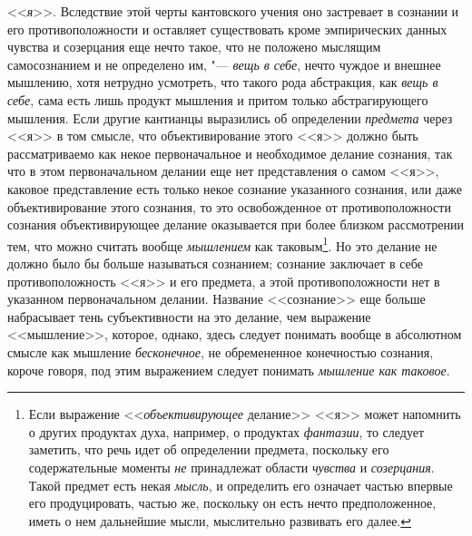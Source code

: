 <<{\em я}>>. Вследствие этой черты кантовского учения оно
застревает в сознании и его противоположности и оставляет существовать
кроме эмпирических данных чувства и созерцания еще нечто такое, что не
положено мыслящим самосознанием и не определено им, "---
{\em вещь в себе}, нечто чуждое и внешнее мышлению,
хотя нетрудно усмотреть, что такого рода абстракция, как
{\em вещь в себе}, сама есть лишь продукт мышления и
притом только абстрагирующего мышления. Если другие
кантианцы
выразились об определении {\em предмета} через <<я>> в
том смысле, что объективирование этого <<я>> должно быть рассматриваемо как
некое первоначальное и необходимое делание сознания, так что в этом
первоначальном делании еще нет представления о самом <<я>>, каковое
представление есть только некое сознание указанного сознания, или даже
объективирование этого сознания, то это освобожденное от противоположности
сознания объективирующее делание оказывается при более близком рассмотрении
тем, что можно считать вообще {\em мышлением} как
таковым\footnote{Если выражение <<{\em объективирующее}
делание>> <<я>> может напомнить о других продуктах духа, например, о продуктах
{\em фантазии}, то следует заметить, что речь идет об
определении предмета, поскольку его содержательные моменты
{\em не} принадлежат области {\em чувства} и
{\em созерцания}. Такой предмет есть некая
{\em мысль}, и определить его означает частью впервые его
продуцировать, частью же, поскольку он есть нечто предположенное, иметь о
нем дальнейшие мысли, мыслительно развивать его далее.}. Но это делание не
должно было бы больше называться сознанием; сознание заключает в себе
противоположность <<я>> и его предмета, а этой противоположности нет в
указанном первоначальном делании. Название <<сознание>> еще больше
набрасывает тень субъективности на это делание, чем выражение <<мышление>>,
которое, однако, здесь следует понимать вообще в абсолютном смысле как
мышление {\em бесконечное}, не обремененное конечностью
сознания, короче говоря, под этим выражением следует понимать
{\em мышление как таковое}.

